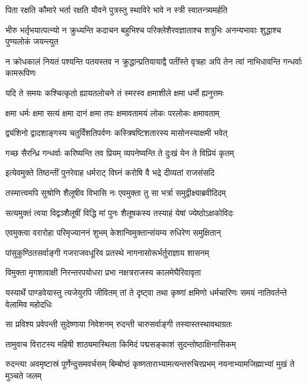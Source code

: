 \twolineshloka
{पिता रक्षति कौमारे भर्ता रक्षति यौवने}
{पुत्रस्तु स्थाविरे भावे न स्त्री स्वातन्त्र्यमर्हति}


\threelineshloka
{भीरु भर्तृभयात्पत्न्यो न क्रुध्यन्ति कदाचन}
{बहुभिश्च परिक्लेशैरवज्ञाताश्च शत्रुभिः}
{अनन्यभावाः शुद्धाश्च पुण्यलोकं जयन्त्युत}


\threelineshloka
{न क्रोधकालं नियतं पश्यन्ति पतयस्तव}
{न क्रुद्धान्प्रतियायाद्वै पतींस्ते वृत्रहा अपि}
{तेन त्वां नाभिधावन्ति गन्धर्वाः कामरूपिणः}


\twolineshloka
{यदि ते समयः कश्चित्कृतो ह्यायतलोचने}
{तं स्मरस्व क्षमाशीले क्षमा धर्मो ह्यनुत्तमः}


\twolineshloka
{क्षमा धर्मः क्षमा सत्यं क्षमा दानं क्षमा तपः}
{क्षमावतामयं लोकः परलोकः क्षमावताम्}


\twolineshloka
{द्व्यंशिनो द्वादशाङ्गस्य चतुर्विंशतिपर्वणः}
{कस्त्रिषष्टिशतारस्य मासोनस्याक्षमी भवेत्}


\twolineshloka
{गच्छ सैरन्ध्रि गन्धर्वाः करिष्यन्ति तव प्रियम्}
{व्यपनेष्यन्ति ते दुःखं येन ते विप्रियं कृतम्}


\twolineshloka
{इत्येवमुक्ते तिष्ठन्तीं पुनरेवाह धर्मराट्}
{विघ्नं करोषि वै भद्रे दीव्यतां राजसंसदि}


\twolineshloka
{तस्मात्त्वमपि सुश्रोणि शैलूषीव विभासि नः}
{एवमुक्ता तु सा भर्त्रा समुद्वीक्ष्याब्रवीदिदम्}


\twolineshloka
{सत्यमुक्तं त्वया विद्वञ्शैलूषीं विद्धि मां पुनः}
{शैलूषकस्य तस्याहं येषां ज्येष्ठोऽक्षकोविदः}


\twolineshloka
{एवमुक्त्वा वरारोहा परिमृज्याननं शुभम्}
{केशान्विमुक्तान्संयम्य रुधिरेण समुक्षितान्}





\twolineshloka
{पांसुकुण्ठितसर्वाङ्गी गजराजवधूरिव}
{प्रतस्थे नागनासोरूर्भर्तुराज्ञाय शासनम्}


\twolineshloka
{विमुक्ता मृगशावाक्षी निरन्तरपयोधरा}
{प्रभा नक्षत्रराजस्य कालमेघैरिवावृता}


\threelineshloka
{यस्यार्थे पाण्डवेयास्तु त्यजेयुरपि जीवितम्}
{तां ते दृष्ट्वा तथा कृष्णां क्षमिणो धर्मचारिणः}
{समयं नातिवर्तन्ते वेलामिव महोदधिः}


\twolineshloka
{सा प्रविश्य प्रवेपन्ती सुदेष्णाया निवेशनम्}
{रुदन्ती चारुसर्वाङ्गी तस्यास्तस्थावथाग्रतः}


\twolineshloka
{तामुवाच विराटस्य महिषी शाठ्यमास्थिता}
{किमिदं पद्मसङ्काशं सुदन्तोष्ठाक्षिनासिकम्}


\threelineshloka
{रुदन्त्या अवमृष्टास्रं पूर्णेन्दुसमवर्चसम्}
{बिम्बोष्ठं कृष्णताराभ्यामत्यन्तरुचिरप्रभम्}
{नयनाभ्यामजिह्माभ्यां मुखं ते मुञ्चते जलम्}


